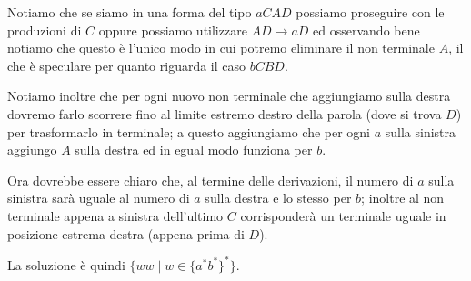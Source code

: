 \documentclass[class=book, crop=false, oneside, 12pt]{standalone}
\begin{document}
Notiamo che se siamo in una forma del tipo $aCAD$ possiamo proseguire con le produzioni di $C$ oppure possiamo utilizzare $AD \to aD$ ed osservando bene notiamo che questo è l'unico modo in cui potremo eliminare il non terminale $A$, il che è speculare per quanto riguarda il caso $bCBD$.

Notiamo inoltre che per ogni nuovo non terminale che aggiungiamo sulla destra dovremo farlo scorrere fino al limite estremo destro della parola (dove si trova $D$) per trasformarlo in terminale; a questo aggiungiamo che per ogni $a$ sulla sinistra aggiungo $A$ sulla destra ed in egual modo funziona per $b$.

Ora dovrebbe essere chiaro che, al termine delle derivazioni, il numero di $a$ sulla sinistra  sarà uguale al numero di $a$ sulla destra e lo stesso per $b$; inoltre al non terminale appena a sinistra dell'ultimo $C$ corrisponderà un terminale uguale in posizione estrema destra (appena prima di $D$).

La soluzione è quindi $\{ ww \mid w \in \{a^* b^*\}^*\}$.
\end{document}
